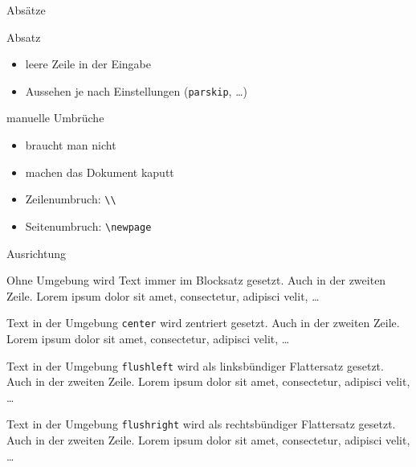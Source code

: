 \begin{Frame}[fragile]{Absätze}
  \begin{Block}{Absatz}
    \begin{itemize}
      \item leere Zeile in der Eingabe
      \item Aussehen je nach Einstellungen (\lstinline-parskip-, \ldots)
    \end{itemize}
  \end{Block}

  \begin{Block}{manuelle Umbrüche}
    \begin{itemize}
      \item braucht man nicht
      \item machen das Dokument kaputt
      \item Zeilenumbruch: \lstinline-\\-
      \item Seitenumbruch: \lstinline-\newpage-
    \end{itemize}
  \end{Block}
\end{Frame}

\begin{Frame}[fragile]{Ausrichtung}
  \newcommand{\lorem}{\textcolor{black!40}{Auch in der zweiten Zeile. Lorem ipsum dolor sit amet, consectetur, adipisci velit, \ldots}}

  \begin{minipage}{\textwidth}
    Ohne Umgebung wird Text immer im Blocksatz gesetzt.
    \lorem
  \end{minipage}

  \xxx

  \begin{center}
    Text in der Umgebung \lstinline-center- wird \alert{zentriert}
    gesetzt.
    \lorem
  \end{center}

  \xxx

  \begin{flushleft}
    Text in der Umgebung \lstinline-flushleft- wird als
    \alert{linksbündiger Flattersatz} gesetzt.
    \lorem
  \end{flushleft}

  \xxx

  \begin{flushright}
    Text in der Umgebung \lstinline-flushright- wird als
    \alert{rechtsbündiger Flattersatz} gesetzt.
    \lorem
  \end{flushright}
\end{Frame}

